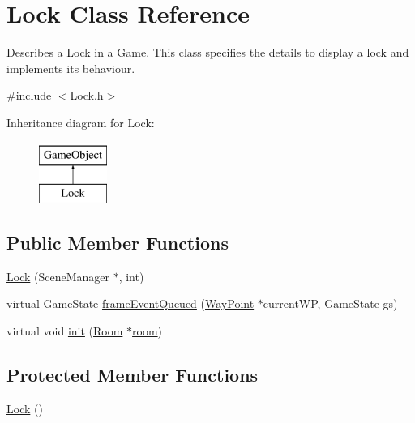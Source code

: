\hypertarget{classLock}{\section{\-Lock \-Class \-Reference}
\label{classLock}
}


\-Describes a \hyperlink{classLock}{\-Lock} in a \hyperlink{classGame}{\-Game}. \-This class specifies the details to display a lock and implements its behaviour.  




{\ttfamily \#include $<$\-Lock.\-h$>$}

\-Inheritance diagram for \-Lock\-:\begin{figure}[H]
\begin{center}
\leavevmode
\includegraphics[height=2.000000cm]{classLock}
\end{center}
\end{figure}
\subsection*{\-Public \-Member \-Functions}
\begin{DoxyCompactItemize}
\item 
\hyperlink{classLock_aae94a6576b49afad57330bf537a8edfc}{\-Lock} (\-Scene\-Manager $\ast$, int)
\item 
virtual \-Game\-State \hyperlink{classLock_a286412e42f06eff3d38b03028300cc01}{frame\-Event\-Queued} (\hyperlink{classWayPoint}{\-Way\-Point} $\ast$current\-W\-P, \-Game\-State gs)
\item 
virtual void \hyperlink{classLock_a357536468a884a9c2943b15b5fc6b39c}{init} (\hyperlink{classRoom}{\-Room} $\ast$\hyperlink{classGameObject_a9f63419cc03f2513f757a317a2e37557}{room})
\end{DoxyCompactItemize}
\subsection*{\-Protected \-Member \-Functions}
\begin{DoxyCompactItemize}
\item 
\hyperlink{classLock_a9944623567d8138b95e74fadc7190adb}{\-Lock} ()
\end{DoxyCompactItemize}
